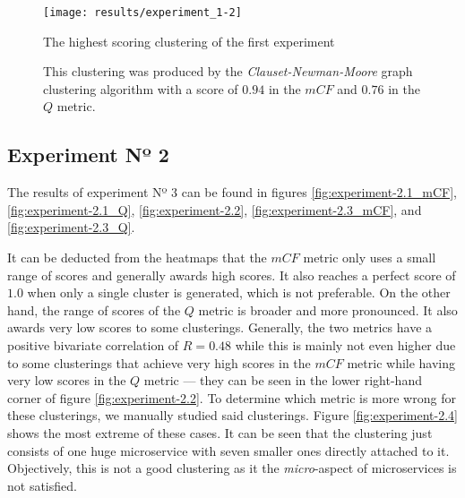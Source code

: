 \documentclass[12pt,a4paper]{report}
\begin{document}
\begin{figure}[htbp]
\centering
\texttt{[image: results/experiment\_1-2]}
\caption{The highest scoring clustering of the first experiment}
\caption*{\centering
  This clustering was produced by the \textit{Clauset-Newman-Moore} graph clustering algorithm with a score of $0.94$ in the $mCF$ and $0.76$ in the $Q$ metric.
}
\label{fig:experiment-1.2}
\end{figure}


\subsection{Experiment Nº 2}

The results of experiment Nº 3 can be found in figures \ref{fig:experiment-2.1_mCF},
\ref{fig:experiment-2.1_Q}, \ref{fig:experiment-2.2}, \ref{fig:experiment-2.3_mCF},
and \ref{fig:experiment-2.3_Q}.

It can be deducted from the heatmaps that the $mCF$ metric only uses a small
range of scores and generally awards high scores. It also reaches a perfect
score of $1.0$ when only a single cluster is generated, which is not
preferable. On the other hand, the range of scores of the $Q$ metric is broader
and more pronounced. It also awards very low scores to some clusterings.
Generally, the two metrics have a positive bivariate correlation of \(R =
0.48\) while this is mainly not even higher due to some clusterings that
achieve very high scores in the $mCF$ metric while having very low scores in
the $Q$ metric --- they can be seen in the lower right-hand corner of figure
\ref{fig:experiment-2.2}. To determine which metric is more wrong for these
clusterings, we manually studied said clusterings. Figure \ref{fig:experiment-2.4}
shows the most extreme of these cases. It can be seen that the clustering
just consists of one huge microservice with seven smaller ones directly
attached to it. Objectively, this is not a good clustering as it the \textit{
micro}\hyp aspect of microservices is not satisfied.
\end{document}
